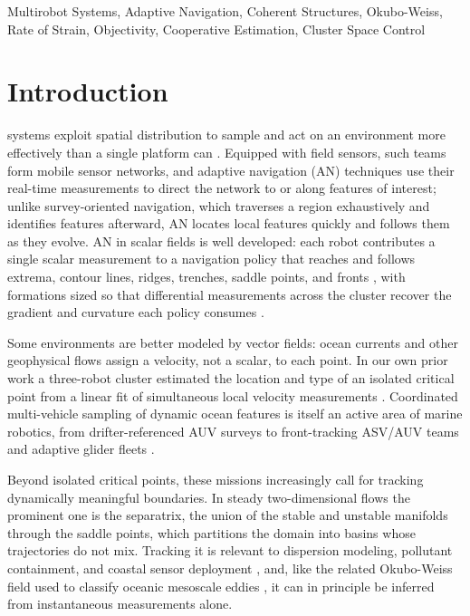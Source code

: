 \documentclass[lettersize,journal]{IEEEtran}
\begin{document}
\begin{IEEEkeywords}
Multirobot Systems, Adaptive Navigation, Coherent Structures,
Okubo-Weiss, Rate of Strain, Objectivity, Cooperative
Estimation, Cluster Space Control
\end{IEEEkeywords}


\section{Introduction}
\label{sec:intro}

 systems exploit spatial distribution to
sample and act on an environment more effectively than a single
platform can \cite{1}. Equipped with field sensors, such teams form
mobile sensor networks, and adaptive navigation (AN) techniques use
their real-time measurements to direct the network to or along features
of interest; unlike survey-oriented navigation, which traverses a
region exhaustively and identifies features afterward, AN locates local
features quickly and follows them as they evolve. AN in scalar fields
is well developed: each robot contributes a single scalar measurement
to a navigation policy that reaches and follows extrema, contour lines,
ridges, trenches, saddle points, and fronts \cite{26,27,28,29}, with
formations sized so that differential measurements across the cluster
recover the gradient and curvature each policy consumes \cite{15,26}.

Some environments are better modeled by vector fields: ocean currents
and other geophysical flows assign a velocity, not a scalar, to each
point. In our own prior work a three-robot cluster estimated the
location and type of an isolated critical point from a linear fit of
simultaneous local velocity measurements \cite{14}. Coordinated
multi-vehicle sampling of dynamic ocean features is itself an active
area of marine robotics, from drifter-referenced AUV surveys \cite{2}
to front-tracking ASV/AUV teams \cite{3} and adaptive glider fleets
\cite{4}.

Beyond isolated critical points, these missions increasingly call for
tracking dynamically meaningful boundaries. In steady two-dimensional
flows the prominent one is the separatrix, the union of the stable and
unstable manifolds through the saddle points, which partitions the
domain into basins whose trajectories do not mix. Tracking it is
relevant to dispersion modeling, pollutant containment, and coastal
sensor deployment \cite{6,7,8}, and, like the related Okubo-Weiss field
used to classify oceanic mesoscale eddies \cite{5}, it can in principle
be inferred from instantaneous measurements alone.
\end{document}
